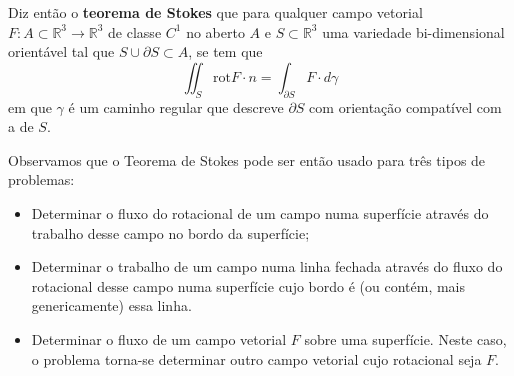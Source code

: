 \documentclass{article}
\newcommand{\R}{\mathbb{R}}
\begin{document}
Diz então o \textbf{teorema de Stokes} que para qualquer campo vetorial $F: A \subset \R^3 \to \R^3$ de classe $C^1$ no aberto $A$ e $S \subset \R^3$ uma variedade bi-dimensional orientável tal que $S \cup \partial S \subset A$, se tem que
$$ \iint_S \text{rot} F \cdot n = \int_{\partial S} F \cdot d \gamma $$
em que $\gamma$ é um caminho regular que descreve $\partial S$ com orientação compatível com a de $S$.

Observamos que o Teorema de Stokes pode ser então usado para três tipos de problemas:
\begin{itemize}
	\item Determinar o fluxo do rotacional de um campo numa superfície através do trabalho desse campo no bordo da superfície;
	\item Determinar o trabalho de um campo numa linha fechada através do fluxo do rotacional desse campo numa superfície cujo bordo é (ou contém, mais genericamente) essa linha.
	\item Determinar o fluxo de um campo vetorial $F$ sobre uma superfície. Neste caso, o problema torna-se determinar outro campo vetorial cujo rotacional seja $F$.
\end{itemize}
\end{document}
